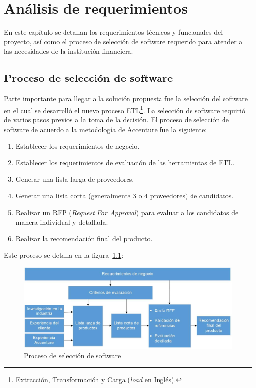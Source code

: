 \chapter{Análisis de requerimientos}
\label{cap:analisis}

En este capítulo se detallan los requerimientos técnicos y funcionales del
proyecto, así como el proceso de selección de software requerido para atender a
las necesidades de la institución financiera.

\section{Proceso de selección de software}

Parte importante para llegar a la solución propuesta fue la selección del
software en el cual se desarrolló el nuevo proceso ETL\footnote{Extracción,
  Transformación y Carga (\emph{load} en Inglés).}. La selección de software
requirió de varios pasos previos a la toma de la decisión. El proceso de
selección de software de acuerdo a la metodología de Accenture fue la siguiente:

\begin{enumerate}
\item Establecer los requerimientos de negocio.
\item Establecer los requerimientos de evaluación de las herramientas de ETL.
\item Generar una lista larga de proveedores.
\item Generar una lista corta (generalmente 3 o 4 proveedores) de candidatos.
\item Realizar un RFP (\emph{Request For Approval}) para evaluar a los
  candidatos de manera individual y detallada.
\item Realizar la recomendación final del producto.
\end{enumerate}

Este proceso se detalla en la figura~\ref{fig:proceso}:

\begin{figure}[htb]
  \begin{center}
    \includegraphics[width=\linewidth]{Proceso_seleccion_software.jpg}
    \caption{Proceso de selección de software}
    \label{fig:proceso}
  \end{center}
\end{figure}

